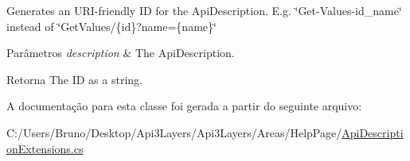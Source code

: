 Generates an U\+R\+I-\/friendly ID for the Api\+Description. E.\+g. \char`\"{}\+Get-\/\+Values-\/id\+\_\+name\char`\"{} instead of \char`\"{}\+Get\+Values/\{id\}?name=\{name\}\char`\"{} 


\begin{DoxyParams}{Parâmetros}
{\em description} & The Api\+Description.\\
\hline
\end{DoxyParams}
\begin{DoxyReturn}{Retorna}
The ID as a string.
\end{DoxyReturn}


A documentação para esta classe foi gerada a partir do seguinte arquivo\+:\begin{DoxyCompactItemize}
\item 
C\+:/\+Users/\+Bruno/\+Desktop/\+Api3\+Layers/\+Api3\+Layers/\+Areas/\+Help\+Page/\hyperlink{ApiDescriptionExtensions_8cs}{Api\+Description\+Extensions.\+cs}\end{DoxyCompactItemize}
